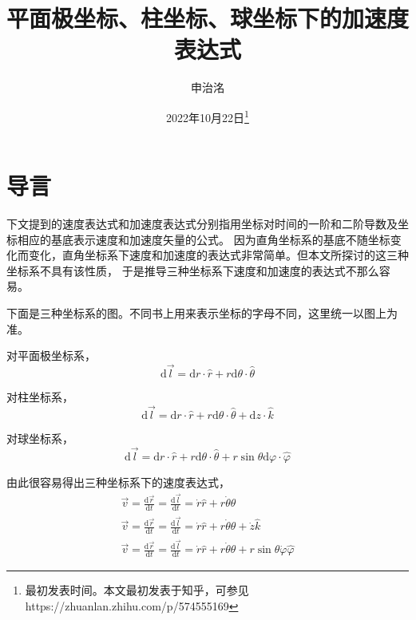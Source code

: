 \documentclass{ctexart}
\title{平面极坐标、柱坐标、球坐标下的加速度表达式}
\author{申治洺}
\date{2022年10月22日\footnote{最初发表时间。本文最初发表于知乎，可参见https://zhuanlan.zhihu.com/p/574555169}}
\begin{document}
    \maketitle  %
    
    \section{导言}\label{sec:1}

    下文提到的速度表达式和加速度表达式分别指用坐标对时间的一阶和二阶导数及坐标相应的基底表示速度和加速度矢量的公式。
    因为直角坐标系的基底不随坐标变化而变化，直角坐标系下速度和加速度的表达式非常简单。但本文所探讨的这三种坐标系不具有该性质，
    于是推导三种坐标系下速度和加速度的表达式不那么容易。

    下面是三种坐标系的图。不同书上用来表示坐标的字母不同，这里统一以图上为准。

    对平面极坐标系，
    \begin{equation*}
        \mathrm{d}\vec{l} = \mathrm{d}r\cdot\hat{r} + r\mathrm{d}\theta\cdot\hat{\theta}
    \end{equation*}
    
    对柱坐标系，
    \begin{equation*}
        \mathrm{d}\vec{l} = \mathrm{d}r\cdot\hat{r} + r\mathrm{d}\theta\cdot\hat{\theta} +
        \mathrm{d}z\cdot\hat{k}
    \end{equation*}
    
    对球坐标系，
    \begin{equation*}
        \mathrm{d}\vec{l} = \mathrm{d}r\cdot\hat{r} + r\mathrm{d}\theta\cdot\hat{\theta} +
        r\sin\theta\mathrm{d}\varphi\cdot\hat{\varphi}
    \end{equation*}

    由此很容易得出三种坐标系下的速度表达式，
    \begin{gather*}
        \vec{v} = \frac{\mathrm{d}\vec{r}}{\mathrm{d}t} = \frac{\mathrm{d}\vec{l}}{\mathrm{d}t} =
        \dot{r}\hat{r} + r\dot{\theta}\hat{\theta} \\
        \vec{v} = \frac{\mathrm{d}\vec{r}}{\mathrm{d}t} = \frac{\mathrm{d}\vec{l}}{\mathrm{d}t} =
        \dot{r}\hat{r} + r\dot{\theta}\hat{\theta} + \dot{z}\hat{k} \\
        \vec{v} = \frac{\mathrm{d}\vec{r}}{\mathrm{d}t} = \frac{\mathrm{d}\vec{l}}{\mathrm{d}t} =
        \dot{r}\hat{r} + r\dot{\theta}\hat{\theta} + r\sin\theta\dot{\varphi}\hat{\varphi}
    \end{gather*}
\end{document}
